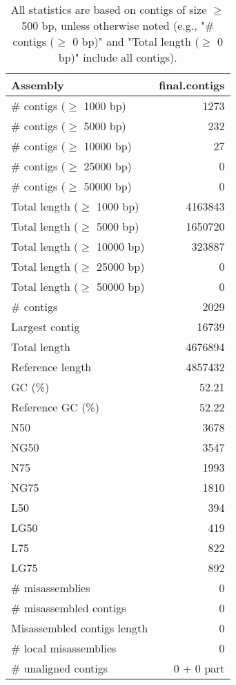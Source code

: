 \documentclass[12pt,a4paper]{article}
\begin{document}
\begin{table}[ht]
\begin{center}
\caption{All statistics are based on contigs of size $\geq$ 500 bp, unless otherwise noted (e.g., "\# contigs ($\geq$ 0 bp)" and "Total length ($\geq$ 0 bp)" include all contigs).}
\begin{tabular}{|l*{1}{|r}|}
\hline
Assembly & final.contigs \\ \hline
\# contigs ($\geq$ 1000 bp) & 1273 \\ \hline
\# contigs ($\geq$ 5000 bp) & 232 \\ \hline
\# contigs ($\geq$ 10000 bp) & 27 \\ \hline
\# contigs ($\geq$ 25000 bp) & 0 \\ \hline
\# contigs ($\geq$ 50000 bp) & 0 \\ \hline
Total length ($\geq$ 1000 bp) & 4163843 \\ \hline
Total length ($\geq$ 5000 bp) & 1650720 \\ \hline
Total length ($\geq$ 10000 bp) & 323887 \\ \hline
Total length ($\geq$ 25000 bp) & 0 \\ \hline
Total length ($\geq$ 50000 bp) & 0 \\ \hline
\# contigs & 2029 \\ \hline
Largest contig & 16739 \\ \hline
Total length & 4676894 \\ \hline
Reference length & 4857432 \\ \hline
GC (\%) & 52.21 \\ \hline
Reference GC (\%) & 52.22 \\ \hline
N50 & 3678 \\ \hline
NG50 & 3547 \\ \hline
N75 & 1993 \\ \hline
NG75 & 1810 \\ \hline
L50 & 394 \\ \hline
LG50 & 419 \\ \hline
L75 & 822 \\ \hline
LG75 & 892 \\ \hline
\# misassemblies & 0 \\ \hline
\# misassembled contigs & 0 \\ \hline
Misassembled contigs length & 0 \\ \hline
\# local misassemblies & 0 \\ \hline
\# unaligned contigs & 0 + 0 part \\ \hline

\end{tabular}
\end{center}
\end{table}
\end{document}
